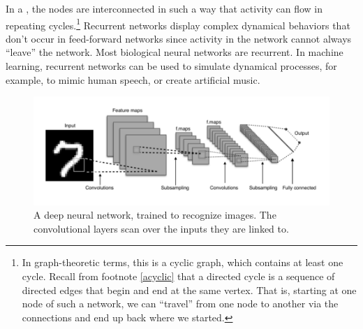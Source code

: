 
In a , the nodes are interconnected in such a way that activity can flow in repeating cycles.\footnote{In graph-theoretic terms, this is a cyclic graph, which contains at least one cycle. Recall from footnote \ref{acyclic} that a directed cycle is a sequence of directed edges that begin and end at the same vertex. That is, starting at one node of such a network, we can ``travel'' from one node to another via the connections and end up back where we started.} Recurrent networks display complex dynamical behaviors that don't occur in feed-forward networks since activity in the network cannot always ``leave'' the network. Most biological neural networks are recurrent. In machine learning, recurrent networks can be used to simulate dynamical processes, for example,  to mimic human speech, or create artificial music.

\begin{figure}[h]
\centering
\includegraphics[scale=.45]{./images/deepNet.png}
\caption[Adapted from a creative commons image by Aphex34 at \url{https://commons.wikimedia.org/wiki/File:Typical_cnn.png} ]{A deep neural network, trained to recognize images. The convolutional layers scan over the inputs they are linked to. }
\label{deep_net}
\end{figure}


